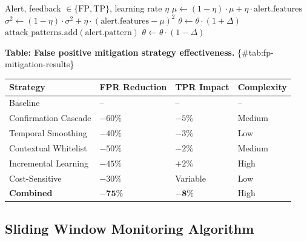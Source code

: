 \documentclass[
]{article}
\newcounter{none} %
\begin{document}
\begin{algorithm}
\caption{Online Baseline Update}
\label{alg:baseline-update}
\begin{algorithmic}[1]
\Require Alert, feedback $\in \{\text{FP}, \text{TP}\}$, learning rate $\eta$
    \State $\mu \gets (1-\eta) \cdot \mu + \eta \cdot \text{alert.features}$
    \State $\sigma^2 \gets (1-\eta) \cdot \sigma^2 + \eta \cdot (\text{alert.features} - \mu)^2$
        \State $\theta \gets \theta \cdot (1 + \Delta)$ 
    \EndIf
\Else {}
    \State $\text{attack\_patterns}.\text{add}(\text{alert.pattern})$
        \State $\theta \gets \theta \cdot (1 - \Delta)$ 
    \EndIf
\EndIf
\end{algorithmic}
\end{algorithm}

\textbf{Table: False positive mitigation strategy effectiveness.}
\{\#tab:fp-mitigation-results\}

{\def\LTcaptype{none} %
\begin{longtable}[]{@{}llll@{}}
\toprule\noalign{}
Strategy & FPR Reduction & TPR Impact & Complexity \\
\midrule\noalign{}
\endhead
\bottomrule\noalign{}
\endlastfoot
Baseline & -- & -- & -- \\
Confirmation Cascade & \(-60\%\) & \(-5\%\) & Medium \\
Temporal Smoothing & \(-40\%\) & \(-3\%\) & Low \\
Contextual Whitelist & \(-50\%\) & \(-2\%\) & Medium \\
Incremental Learning & \(-45\%\) & \(+2\%\) & High \\
Cost-Sensitive & \(-30\%\) & Variable & Low \\
\textbf{Combined} & \(\mathbf{-75\%}\) & \(\mathbf{-8\%}\) & High \\
\end{longtable}
}

\subsection{Sliding Window Monitoring
Algorithm}\label{sliding-window-monitoring-algorithm}
\end{document}
